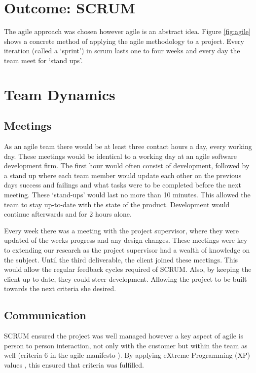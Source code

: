 \section{Outcome: SCRUM}
The agile approach was chosen however agile is an abstract idea. Figure \ref{fig:agile} shows a concrete method of applying the agile methodology to a project. Every iteration (called a `sprint') in scrum lasts one to four weeks and every day the team meet for `stand ups'.


\section{Team Dynamics}
\subsection{Meetings}
As an agile team there would be at least three contact hours a day, every working day. These meetings would be identical to a working day at an agile software development firm. The first hour would often consist of development, followed by a stand up where each team member would update each other on the previous days success and failings and what tasks were to be completed before the next meeting. These `stand-ups' would last no more than 10 minutes. This allowed the team to stay up-to-date with the state of the product. Development would continue afterwards and for 2 hours alone. 

Every week there was a meeting with the project supervisor, where they were updated of the weeks progress and any design changes. These meetings were key to extending our research as the project supervisor had a wealth of knowledge on the subject. Until the third deliverable, the client joined these meetings. This would allow the regular feedback cycles required of SCRUM. Also, by keeping the client up to date, they could steer development. Allowing the project to be built towards the next criteria she desired.

\subsection{Communication}
SCRUM ensured the project was well managed however a key aspect of agile is person to person interaction, not only with the customer but within the team as well (criteria 6 in the agile manifesto \cite{agile:manifesto}). By applying eXtreme Programming (XP) values \citep{XP:values}, this ensured that criteria was fulfilled. 

